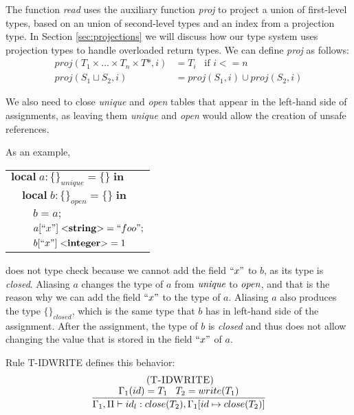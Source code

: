 \documentclass{sigplanconf}
\newcommand{\Integer}{\mathbf{integer}}
\newcommand{\String}{\mathbf{string}}
\newcommand{\mylabel}[1]{\; (\textsc{#1})}
\newcommand{\env}{\Gamma}
\newcommand{\penv}{\Pi}
\begin{document}
The function \emph{read} uses the auxiliary function \emph{proj}
to project a union of first-level types, based on an union of
second-level types and an index from a projection type.
In Section \ref{sec:projections} we will discuss how our type system uses
projection types to handle overloaded return types.
We can define \emph{proj} as follows:
\begin{align*}
proj(T_{1} \times ... \times T_{n} \times T{*}, i) & =  T_{i} \;\;\; \text{if $i <= n$}\\
proj(S_{1} \sqcup S_{2}, i) & = proj(S_{1}, i) \cup proj(S_{2}, i)
\end{align*}

We also need to close \emph{unique} and \emph{open} tables that
appear in the left-hand side of assignments, as leaving them
\emph{unique} and \emph{open} would allow the creation of
unsafe references.

As an example,
\begin{center}
\begin{tabular}{lll}
\multicolumn{3}{l}{$\mathbf{local} \; a:\{\}_{unique} = \{\} \; \mathbf{in}$}\\
& \multicolumn{2}{l}{$\mathbf{local} \; b:\{\}_{open} = \{\} \; \mathbf{in}$}\\
& & \multicolumn{1}{l}{$b = a;$}\\
& & \multicolumn{1}{l}{$a[``x"] \; {<}\String{>} = ``foo";$}\\
& & \multicolumn{1}{l}{$b[``x"] \; {<}\Integer{>} = 1$}\\
\end{tabular}
\end{center}
does not type check because we cannot add the field $``x"$ to $b$,
as its type is \emph{closed}.
Aliasing $a$ changes the type of $a$ from $\emph{unique}$ to
$\emph{open}$, and that is the reason why we can add the field
$``x"$ to the type of $a$.
Aliasing $a$ also produces the type $\{\}_{closed}$, which is
the same type that $b$ has in left-hand side of the assignment.
After the assignment, the type of $b$ is \emph{closed} and thus
does not allow changing the value that is stored in the field
$``x"$ of $a$.

Rule \textsc{T-IDWRITE} defines this behavior:
\[
\begin{array}{c}
\mylabel{T-IDWRITE}\\
\dfrac{\env_{1}(id) = T_{1} \;\;\; T_{2} = write(T_{1})}
      {\env_{1}, \penv \vdash id_{l}:close(T_{2}), \env_{1}[id \mapsto close(T_{2})]}
\end{array}
\]
\end{document}
